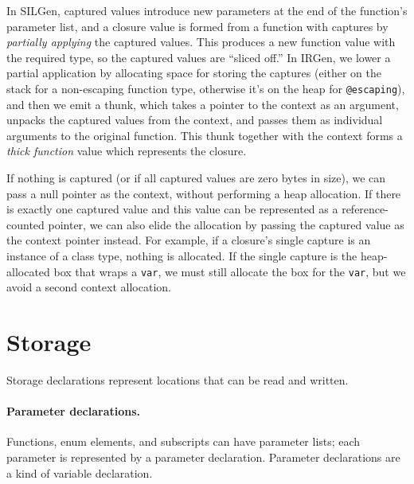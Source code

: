 \documentclass[../generics]{subfiles}
\begin{document}
In SILGen, captured values introduce new parameters at the end of the function's parameter list, and a closure value is formed from a function with captures by \emph{partially applying} the captured values. This produces a new function value with the required type, so the captured values are ``sliced off.'' In IRGen, we lower a partial application by allocating space for storing the captures (either on the stack for a non-escaping function type, otherwise it's on the heap for \texttt{@escaping}), and then we emit a thunk, which takes a pointer to the context as an argument, unpacks the captured values from the context, and passes them as individual arguments to the original function. This thunk together with the context forms a \emph{thick function} value which represents the closure.

If nothing is captured (or if all captured values are zero bytes in size), we can pass a null pointer as the context, without performing a heap allocation. If there is exactly one captured value and this value can be represented as a reference-counted pointer, we can also elide the allocation by passing the captured value as the context pointer instead. For example, if a closure's single capture is an instance of a class type, nothing is allocated. If the single capture is the heap-allocated box that wraps a \texttt{var}, we must still allocate the box for the \texttt{var}, but we avoid a second context allocation.

\section{Storage}\label{other decls}

Storage declarations represent locations that can be read and written.

\paragraph{Parameter declarations.} Functions, enum elements, and subscripts can have parameter lists; each parameter is represented by a parameter declaration. Parameter declarations are a kind of variable declaration.
\end{document}
